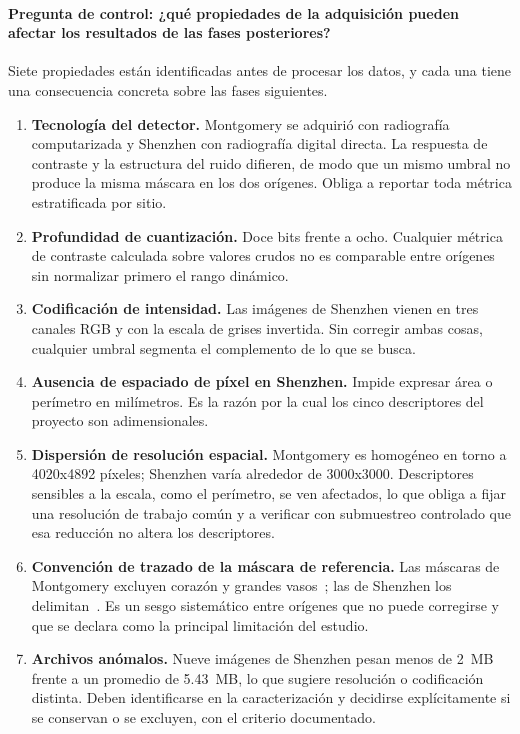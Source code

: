 \documentclass[12pt,a4paper]{article}
\begin{document}
\paragraph{Pregunta de control: ¿qué propiedades de la adquisición pueden afectar
los resultados de las fases posteriores?}

Siete propiedades están identificadas antes de procesar los datos, y cada una tiene
una consecuencia concreta sobre las fases siguientes.

\begin{enumerate}
    \item \textbf{Tecnología del detector.} Montgomery se adquirió con radiografía
    computarizada y Shenzhen con radiografía digital directa. La respuesta de
    contraste y la estructura del ruido difieren, de modo que un mismo umbral no
    produce la misma máscara en los dos orígenes. Obliga a reportar toda métrica
    estratificada por sitio.

    \item \textbf{Profundidad de cuantización.} Doce bits frente a ocho. Cualquier
    métrica de contraste calculada sobre valores crudos no es comparable entre
    orígenes sin normalizar primero el rango dinámico.

    \item \textbf{Codificación de intensidad.} Las imágenes de Shenzhen vienen en
    tres canales RGB y con la escala de grises invertida. Sin corregir ambas cosas,
    cualquier umbral segmenta el complemento de lo que se busca.

    \item \textbf{Ausencia de espaciado de píxel en Shenzhen.} Impide expresar área
    o perímetro en milímetros. Es la razón por la cual los cinco descriptores del
    proyecto son adimensionales.

    \item \textbf{Dispersión de resolución espacial.} Montgomery es homogéneo en
    torno a 4020x4892 píxeles; Shenzhen varía alrededor de 3000x3000. Descriptores
    sensibles a la escala, como el perímetro, se ven afectados, lo que obliga a
    fijar una resolución de trabajo común y a verificar con submuestreo controlado
    que esa reducción no altera los descriptores.

    \item \textbf{Convención de trazado de la máscara de referencia.} Las máscaras
    de Montgomery excluyen corazón y grandes vasos~\cite{candemir2014}; las de Shenzhen los delimitan~\cite{stirenko2018}.
    Es un sesgo sistemático entre orígenes que no puede corregirse y que se declara
    como la principal limitación del estudio.

    \item \textbf{Archivos anómalos.} Nueve imágenes de Shenzhen pesan menos de
    2~MB frente a un promedio de 5.43~MB, lo que sugiere resolución o codificación
    distinta. Deben identificarse en la caracterización y decidirse explícitamente
    si se conservan o se excluyen, con el criterio documentado.
\end{enumerate}
\end{document}
